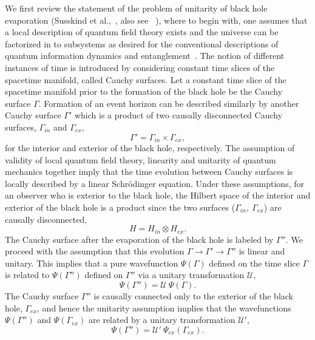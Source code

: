 \documentclass[10pt,letterpaper,aps,onecolumn,superscriptaddress,floatfix,notitlepage]{revtex4-1}
\begin{document}
	We first review the statement of the problem of unitarity of black hole evaporation (Susskind et al.,~\cite{complementarity}, also see ~\cite{infopara}), where to begin with, one assumes that a local description of quantum field theory exists and the universe can be factorized in to subsystems as desired for the conventional descriptions of quantum information dynamics and entanglement~\cite{horowitz,infopara,projection}. The notion of different instances of time is introduced by considering constant time slices of the spacetime manifold, called Cauchy surfaces. Let a constant time slice of the spacetime manifold prior to the formation of the black hole be the Cauchy surface $\Gamma$. Formation of an event horizon can be described similarly by another Cauchy surface $\Gamma'$ which is a product of two causally disconnected Cauchy surfaces, $\Gamma_{in}$ and $\Gamma_{ex}$,
	\begin{equation}
	\Gamma' = \Gamma_{in}\times\Gamma_{ex},\end{equation}
	for the interior and exterior of the black hole, respectively. The assumption of validity of local quantum field theory, linearity and unitarity of quantum mechanics together imply that the time evolution between Cauchy surfaces is locally described by a linear Schr\"{o}dinger equation. Under these assumptions, for an observer who is exterior to the black hole, the Hilbert space of the interior and exterior of the black hole is a product since the two surfaces ($\Gamma_{in},~\Gamma_{ex}$) are causally disconnected,
	\begin{equation}
	H=H_{in}\otimes H_{ex}.
	\end{equation}
	The Cauchy surface after the evaporation of the black hole is labeled by $\Gamma''$. We proceed with the assumption that this evolution  $\Gamma\rightarrow\Gamma'\rightarrow\Gamma''$ is linear and unitary. This implies that a pure wavefunction $\Psi(\Gamma)$ defined on the time slice $\Gamma$ is related to $\Psi(\Gamma'')$ defined on $\Gamma''$  via a unitary transformation $\mathcal{U}$,
	\begin{equation}
	\Psi(\Gamma'')=\mathcal{U}~\Psi(\Gamma).
	\end{equation}
	The Cauchy surface $\Gamma''$ is causally connected only to the exterior of the black hole, $\Gamma_{ex}$, and hence the unitarity assumption implies that the wavefunctions $\Psi(\Gamma'')$ and $\Psi(\Gamma_{ex})$ are related by a unitary transformation $\mathcal{U'}$,   
	\begin{equation}
	\Psi(\Gamma'') = \mathcal{U'}~\Psi_{ex}(\Gamma_{ex}).
	\end{equation}
\end{document}
